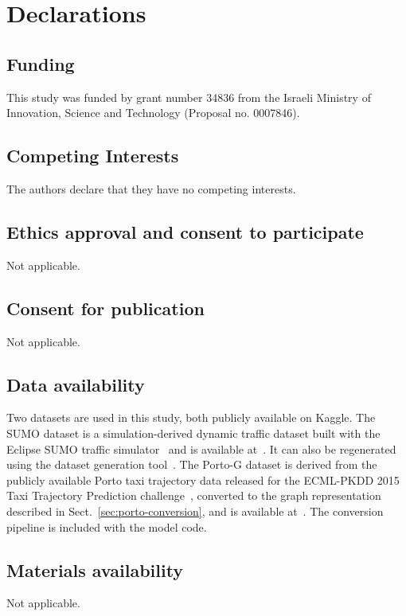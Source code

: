 \documentclass[pdflatex,sn-basic,Numbered]{sn-jnl}%
\begin{document}
\backmatter


\section*{Declarations}

\subsection*{Funding}
This study was funded by grant number 34836 from the Israeli Ministry of Innovation, Science and Technology (Proposal no. 0007846).

\subsection*{Competing Interests}
The authors declare that they have no competing interests.

\subsection*{Ethics approval and consent to participate}
Not applicable.

\subsection*{Consent for publication}
Not applicable.

\subsection*{Data availability}
Two datasets are used in this study, both publicly available on Kaggle. The SUMO dataset is a simulation-derived dynamic traffic dataset built with the Eclipse SUMO traffic simulator~\cite{SUMO2018} and is available at~\cite{tordjman2026sumokaggle}. It can also be regenerated using the dataset generation tool~\cite{sumo_data_generator}. The Porto-G dataset is derived from the publicly available Porto taxi trajectory data released for the ECML-PKDD 2015 Taxi Trajectory Prediction challenge~\cite{moreira2013porto}, converted to the graph representation described in Sect.~\ref{sec:porto-conversion}, and is available at~\cite{tordjman2026portokaggle}. The conversion pipeline is included with the model code.

\subsection*{Materials availability}
Not applicable.
\end{document}
